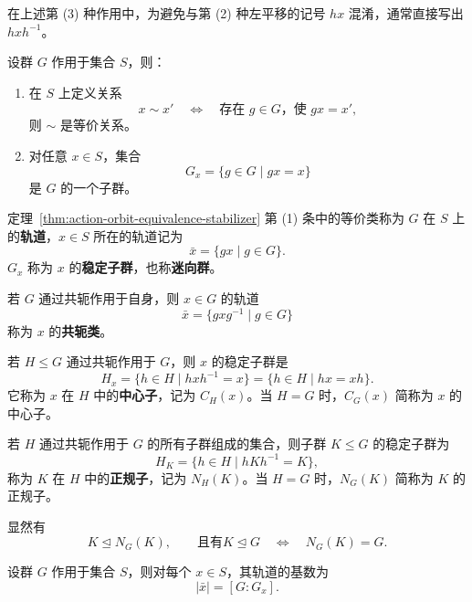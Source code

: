 \begin{purplenote}
在上述第 (3) 种作用中，为避免与第 (2) 种左平移的记号 $hx$ 混淆，通常直接写出 $hxh^{-1}$。
\end{purplenote}

\begin{theorem}\label{thm:action-orbit-equivalence-stabilizer}
设群 $G$ 作用于集合 $S$，则：
\begin{enumerate}[label=(\arabic*)]
  \item 在 $S$ 上定义关系
  \[
    x\sim x'\quad\Longleftrightarrow\quad
    \text{存在 }g\in G\text{，使 }gx=x',
  \]
  则 $\sim$ 是等价关系。
  \item 对任意 $x\in S$，集合
  \[
    G_x=\{g\in G\mid gx=x\}
  \]
  是 $G$ 的一个子群。
\end{enumerate}
\end{theorem}

\begin{purplenote}
定理~\ref{thm:action-orbit-equivalence-stabilizer} 第 (1) 条中的等价类称为 $G$ 在 $S$ 上的\textbf{轨道}，$x\in S$ 所在的轨道记为
\[
  \bar x=\{gx\mid g\in G\}.
\]
$G_x$ 称为 $x$ 的\textbf{稳定子群}，也称\textbf{迷向群}。
\end{purplenote}

\begin{example}\label{ex:conjugacy-centralizer-normalizer}
若 $G$ 通过共轭作用于自身，则 $x\in G$ 的轨道
\[
  \bar x=\{gxg^{-1}\mid g\in G\}
\]
称为 $x$ 的\textbf{共轭类}。

若 $H\leq G$ 通过共轭作用于 $G$，则 $x$ 的稳定子群是
\[
  H_x=\{h\in H\mid hxh^{-1}=x\}
      =\{h\in H\mid hx=xh\}.
\]
它称为 $x$ 在 $H$ 中的\textbf{中心子}，记为 $C_H(x)$。当 $H=G$ 时，$C_G(x)$ 简称为 $x$ 的中心子。

若 $H$ 通过共轭作用于 $G$ 的所有子群组成的集合，则子群 $K\leq G$ 的稳定子群为
\[
  H_K=\{h\in H\mid hKh^{-1}=K\},
\]
称为 $K$ 在 $H$ 中的\textbf{正规子}，记为 $N_H(K)$。当 $H=G$ 时，$N_G(K)$ 简称为 $K$ 的正规子。
\end{example}

\begin{purplenote}
显然有
\[
  K\trianglelefteq N_G(K),\qquad
  \text{且有} K\trianglelefteq G\quad\Longleftrightarrow\quad N_G(K)=G.
\]
\end{purplenote}

\begin{theorem}\label{thm:orbit-stabilizer-cardinality}
设群 $G$ 作用于集合 $S$，则对每个 $x\in S$，其轨道的基数为
\[
  |\bar x|=[G:G_x].
\]
\end{theorem}

